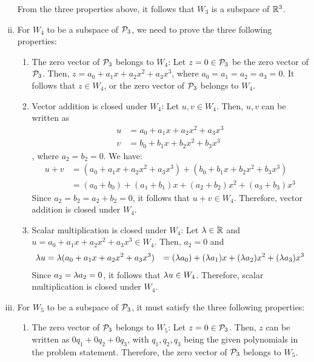 \begin{sol}
\begin{enumerate}[(i)]
        From the three properties above, it follows that $W_3$ is a subspace of $\R^{3}$.
        \item For $W_4$ to be a subspace of $\P_3$, we need to prove the three following properties:
        \begin{enumerate}[(1)]
            \item The zero vector of $\P_3$ belongs to $W_4$: Let $z=0\in\P_3$ be the zero vector of $\P_3$. Then, $z=a_0+a_1x+a_2x^{2}+a_3x^{3}$, where $a_0=a_1=a_2=a_3=0$. It follows that $z\in W_4$, or the zero vector of $\P_3$ belongs to $W_4$.
            \item Vector addition is closed under $W_4$: Let $u,v\in W_4$. Then, $u, v$ can be written as
            \[
                \begin{aligned}
                    u & = a_0+a_1x+a_2x^{2}+a_3x^{3} \\
                    v & = b_0+b_1x+b_2x^{2}+b_3x^{3}
                \end{aligned}
            \]
            , where $a_2=b_2=0$. We have:
            \[
                \begin{aligned}
                    u+v & = (a_0+a_1x+a_2x^{2}+a_3x^{3})+(b_0+b_1x+b_2x^{2}+b_3x^{3}) \\
                        & = (a_0+b_0)+(a_1+b_1)x+(a_2+b_2)x^{2}+(a_3+b_3)x^{3}
                \end{aligned}
            \]
            Since $a_2=b_2=a_2+b_2=0$, it follows that $u+v\in W_4$. Therefore, vector addition is closed under $W_4$.
            \item Scalar multiplication is closed under $W_4$: Let $\lam\in\R$ and $u=a_0+a_1x+a_2x^{2}+a_3x^{3}\in W_4$. Then, $a_2=0$ and
            \[
                \begin{aligned}
                    \lam u & = \lam(a_0+a_1x+a_2x^{2}+a_3x^{3})
                            & = (\lam a_0)+(\lam a_1)x+(\lam a_2)x^{2}+(\lam a_3)x^{3}
                \end{aligned}
            \]
            Since $a_2=\lam a_2=0$, it follows that $\lam u\in W_4$. Therefore, scalar multiplication is closed under $W_4$.
        \end{enumerate}
        \item For $W_5$ to be a subspace of $\P_3$, it must satisfy the three following properties:
        \begin{enumerate}[(1)]
            \item The zero vector of $\P_3$ belongs to $W_5$: Let $z=0\in\P_3$. Then, $z$ can be written as $0q_1+0q_2+0q_3$, with $q_1,q_2,q_3$ being the given polynomials in the problem statement. Therefore, the zero vector of $\P_3$ belongs to $W_5$.

\end{enumerate}
\end{enumerate}
\end{sol}
